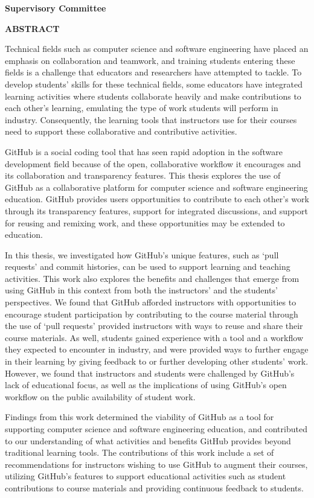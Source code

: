 \newpage
{}

\noindent \textbf{Supervisory Committee}
\tpbreak
\panel

\begin{center}
\textbf{ABSTRACT}
\end{center}

Technical fields such as computer science and software engineering have placed an emphasis on collaboration and teamwork, and training students entering these fields is a challenge that educators and researchers have attempted to tackle. To develop students' skills for these technical fields, some educators have integrated learning activities where students collaborate heavily and make contributions to each other's learning, emulating the type of work students will perform in industry. Consequently, the learning tools that instructors use for their courses need to support these collaborative and contributive activities.

GitHub is a social coding tool that has seen rapid adoption in the software development field because of the open, collaborative workflow it encourages and its collaboration and transparency features. This thesis explores the use of GitHub as a collaborative platform for computer science and software engineering education. GitHub provides users opportunities to contribute to each other's work through its transparency features, support for integrated discussions, and support for reusing and remixing work, and these opportunities may be extended to education.

In this thesis, we investigated how GitHub's unique features, such as `pull requests' and commit histories, can be used to support learning and teaching activities. This work also explores the benefits and challenges that emerge from using GitHub in this context from both the instructors' and the students' perspectives. We found that GitHub afforded instructors with opportunities to encourage student participation by contributing to the course material through the use of `pull requests' provided instructors with ways to reuse and share their course materials. As well, students gained experience with a tool and a workflow they expected to encounter in industry, and were provided ways to further engage in their learning by giving feedback to or further developing other students' work. However, we found that instructors and students were challenged by GitHub's lack of educational focus, as well as the implications of using GitHub's open workflow on the public availability of student work.

Findings from this work determined the viability of GitHub as a tool for supporting computer science and software engineering education, and contributed to our understanding of what activities and benefits GitHub provides beyond traditional learning tools. The contributions of this work include a set of recommendations for instructors wishing to use GitHub to augment their courses, utilizing GitHub's features to support educational activities such as student contributions to course materials and providing continuous feedback to students.
